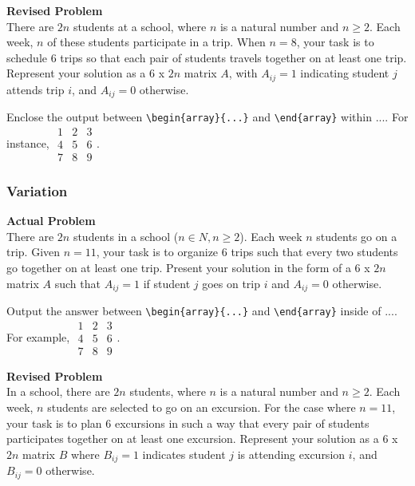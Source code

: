 \textbf{Revised Problem}\\
There are $2n$ students at a school, where $n$ is a natural number and $n \geq 2$. Each week, $n$ of these students participate in a trip. When $n = 8$, your task is to schedule 6 trips so that each pair of students travels together on at least one trip. Represent your solution as a 6 x $2n$ matrix $A$, with $A_{ij} = 1$ indicating student $j$ attends trip $i$, and $A_{ij} = 0$ otherwise.

Enclose the output between \verb|\begin{array}{...}| and \verb|\end{array}| within $\boxed{...}$. For instance, $\boxed{\begin{array}{ccc}1 & 2 & 3 \\ 4 & 5 & 6 \\ 7 & 8 & 9\end{array}}$.

\subsubsection{Variation}
\textbf{Actual Problem}\\
There are $2n$ students in a school ($n \in N, n \geq 2$). Each week $n$ students go on a trip.
Given $n = 11$, your task is to organize 6 trips such that every two students go together on at least one trip. Present your solution 
in the form of a 6 x $2n$ matrix $A$ such that $A_{ij} = 1$ if student $j$ goes on trip $i$ and $A_{ij} = 0$ otherwise.

Output the answer between \verb|\begin{array}{...}| and \verb|\end{array}| inside of $\boxed{...}$. For example, $\boxed{\begin{array}{ccc}1 & 2 & 3 \\ 4 & 5 & 6 \\ 7 & 8 & 9\end{array}}$.

\textbf{Revised Problem}\\
In a school, there are $2n$ students, where $n$ is a natural number and $n \geq 2$. Each week, $n$ students are selected to go on an excursion. For the case where $n = 11$, your task is to plan 6 excursions in such a way that every pair of students participates together on at least one excursion. Represent your solution as a 6 x $2n$ matrix $B$ where $B_{ij} = 1$ indicates student $j$ is attending excursion $i$, and $B_{ij} = 0$ otherwise.

